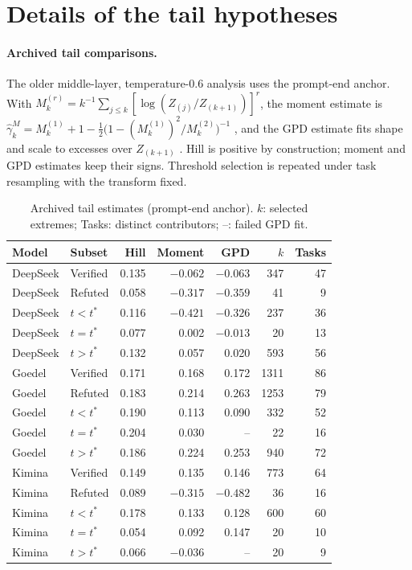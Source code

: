 \section{Details of the tail hypotheses}\label{app:tails}

\paragraph{Archived tail comparisons.} The older middle-layer, temperature-0.6 analysis uses the prompt-end anchor. With $M_k^{(r)}=k^{-1}\sum_{j\le k}[\log(Z_{(j)}/Z_{(k+1)})]^r$, the moment estimate is $\hat\gamma_k^M=M_k^{(1)}+1-\tfrac12\bigl(1-(M_k^{(1)})^2/M_k^{(2)}\bigr)^{-1}$ \citep{dekkers1989}, and the GPD estimate fits shape and scale to excesses over $Z_{(k+1)}$ \citep{pickands1975}. Hill is positive by construction; moment and GPD estimates keep their signs. Threshold selection is repeated under task resampling with the transform fixed.

\begin{table}[h]
\caption{Archived tail estimates (prompt-end anchor). $k$: selected extremes; Tasks: distinct contributors; --: failed GPD fit.}
\label{tab:tails}
\begin{center}
\small
\begin{tabular}{llrrrrr}
\toprule
Model & Subset & Hill & Moment & GPD & $k$ & Tasks\\
\midrule
DeepSeek & Verified & 0.135 & $-0.062$ & $-0.063$ & 347 & 47\\
DeepSeek & Refuted & 0.058 & $-0.317$ & $-0.359$ & 41 & 9\\
DeepSeek & $t<t^*$ & 0.116 & $-0.421$ & $-0.326$ & 237 & 36\\
DeepSeek & $t=t^*$ & 0.077 & 0.002 & $-0.013$ & 20 & 13\\
DeepSeek & $t>t^*$ & 0.132 & 0.057 & 0.020 & 593 & 56\\
Goedel & Verified & 0.171 & 0.168 & 0.172 & 1311 & 86\\
Goedel & Refuted & 0.183 & 0.214 & 0.263 & 1253 & 79\\
Goedel & $t<t^*$ & 0.190 & 0.113 & 0.090 & 332 & 52\\
Goedel & $t=t^*$ & 0.204 & 0.030 & -- & 22 & 16\\
Goedel & $t>t^*$ & 0.186 & 0.224 & 0.253 & 940 & 72\\
Kimina & Verified & 0.149 & 0.135 & 0.146 & 773 & 64\\
Kimina & Refuted & 0.089 & $-0.315$ & $-0.482$ & 36 & 16\\
Kimina & $t<t^*$ & 0.178 & 0.133 & 0.128 & 600 & 60\\
Kimina & $t=t^*$ & 0.054 & 0.092 & 0.147 & 20 & 10\\
Kimina & $t>t^*$ & 0.066 & $-0.036$ & -- & 20 & 9\\
\bottomrule
\end{tabular}
\end{center}
\end{table}

